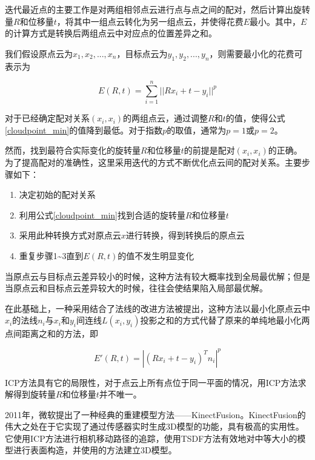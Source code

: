 \documentclass{llncs}
\begin{document}
\begin{CJK}{UTF8}{song}
迭代最近点的主要工作是对两组相邻点云进行点与点之间的配对，然后计算出旋转量$R$和位移量$t$，将其中一组点云转化为另一组点云，并使得花费$E$最小\cite{DBLP:journals/pami/BeslM92}。其中，$E$的计算方式是转换后两组点云中对应点的位置差异之和。

我们假设原点云为$x_1,x_2,...,x_n$，目标点云为$y_1,y_2,...,y_n$，则需要最小化的花费可表示为

\begin{equation}
\label{cloudpoint_min}
	E(R,t) = \sum_{i=1}^n||Rx_i+t-y_i||^p
\end{equation}

对于已经确定配对关系$(x_i,x_i)$的两组点云，通过调整$R$和$t$的值，使得公式\ref{cloudpoint_min}的值降到最低。对于指数$p$的取值，通常为$p=1$或$p=2$。

然而，找到最符合实际变化的旋转量$R$和位移量$t$的前提是配对$(x_i,x_i)$的正确。为了提高配对的准确性，这里采用迭代的方式不断优化点云间的配对关系。主要步骤如下：

\begin{enumerate}
\item{决定初始的配对关系}
\item{利用公式\ref{cloudpoint_min}找到合适的旋转量$R$和位移量$t$}
\item{采用此种转换方式对原点云$x$进行转换，得到转换后的原点云}
\item{重复步骤1\~{}3直到$E(R,t)$的值不发生明显变化}
\end{enumerate}

当原点云与目标点云差异较小的时候，这种方法有较大概率找到全局最优解；但是当原点云和目标点云差异较大的时候，往往会使结果陷入局部最优解。

在此基础上，一种采用结合了法线的改进方法被提出\cite{Chen1992Object}，这种方法以最小化原点云中$x_i$的法线$n_i$与$x_i$和$y_i$间连线$L(x_i,y_i)$投影之和的方式代替了原来的单纯地最小化两点间距离之和的方法，即

\begin{equation}
E'(R,t) = |(Rx_i+t-y_i)^Tn_i|^p
\end{equation}

ICP方法具有它的局限性，对于点云上所有点位于同一平面的情况，用ICP方法求解得到旋转量$R$和位移量$t$并不唯一。

2011年，微软提出了一种经典的重建模型方法——KinectFusion。KinectFusion\cite{DBLP:conf/ismar/NewcombeIHMKDKSHF11}的伟大之处在于它实现了通过传感器实时生成3D模型的功能，具有极高的实用性。它使用ICP方法进行相机移动路径的追踪，使用TSDF方法有效地对中等大小的模型进行表面构造，并使用\cite{DBLP:conf/siggraph/CurlessL96}的方法建立3D模型。


\end{CJK}
\end{document}
